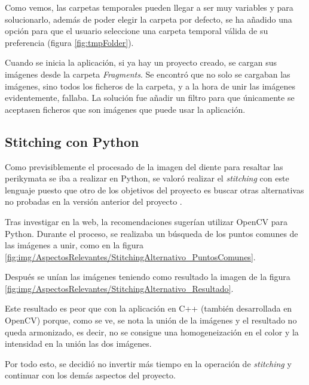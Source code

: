 Como vemos, las carpetas temporales pueden llegar a ser muy variables y para solucionarlo, además de poder elegir la carpeta por defecto, se ha añadido una opción para que el usuario seleccione una carpeta temporal válida de su preferencia (figura \ref{fig:tmpFolder}).


Cuando se inicia la aplicación, si ya hay un proyecto creado, se cargan sus imágenes desde la carpeta \textit{Fragments}. Se encontró que no solo se cargaban las imágenes, sino todos los ficheros de la carpeta, y a la hora de unir las imágenes evidentemente, fallaba. La solución fue añadir un filtro para que únicamente se aceptasen ficheros que son imágenes que puede usar la aplicación.

\subsection{Stitching con Python}
\label{ar:stitchingPython}
Como previsiblemente el procesado de la imagen del diente para resaltar las perikymata se iba a realizar en Python, se valoró realizar el \textit{stitching} con este lenguaje puesto que otro de los objetivos del proyecto es buscar otras alternativas no probadas en la versión anterior del proyecto \cite{perikymataV1}. 

Tras investigar en la web, la recomendaciones sugerían utilizar OpenCV para Python. Durante el proceso, se realizaba un búsqueda de los puntos comunes de las imágenes a unir, como en la figura \ref{fig:img/AspectosRelevantes/StitchingAlternativo_PuntosComunes}.


Después se unían las imágenes teniendo como resultado la imagen de la figura \ref{fig:img/AspectosRelevantes/StitchingAlternativo_Resultado}.

Este resultado es peor que con la aplicación en C++ (también desarrollada en OpenCV) porque, como se ve, se nota la unión de la imágenes y el resultado no queda armonizado, es decir, no se consigue una homogeneización en el color y la intensidad en la unión las dos imágenes. 

Por todo esto, se decidió no invertir más tiempo en la operación de \textit{stitching} y continuar con los demás aspectos del proyecto.

